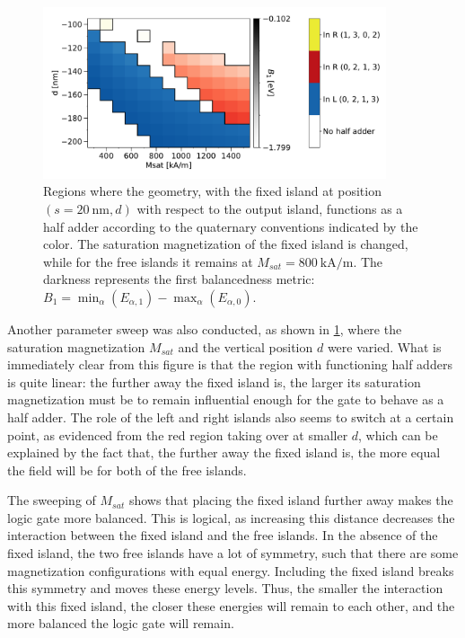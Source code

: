 \documentclass[11pt,a4paper,english]{article}
\begin{document}
\begin{figure}
    \centering
    \includegraphics[width=0.9\textwidth]{Figures/half_adder/sweep/000006_d-Msat/table(d100-200_10,Msat3e5-15e5_1e5)_balanced1.pdf}
    \caption{Regions where the geometry, with the fixed island at position $(s=\SI{20}{\nano\metre}, d)$ with respect to the output island, functions as a half adder according to the quaternary conventions indicated by the color. The saturation magnetization of the fixed island is changed, while for the free islands it remains at $M_{sat} = \SI{800}{\kilo\ampere\per\metre}$. The darkness represents the first balancedness metric: $B_1 = \min_\alpha(E_{\alpha,1}) - \max_\alpha(E_{\alpha,0})$.} 
    \label{fig:HalfAdder_000006_sweep_d-Msat_balanced1}
\end{figure}
Another parameter sweep was also conducted, as shown in \cref{fig:HalfAdder_000006_sweep_d-Msat_balanced1}, where the saturation magnetization $M_{sat}$ and the vertical position $d$ were varied. What is immediately clear from this figure is that the region with functioning half adders is quite linear: the further away the fixed island is, the larger its saturation magnetization must be to remain influential enough for the gate to behave as a half adder. The role of the left and right islands also seems to switch at a certain point, as evidenced from the red region taking over at smaller $d$, which can be explained by the fact that, the further away the fixed island is, the more equal the field will be for both of the free islands. \par
The sweeping of $M_{sat}$ shows that placing the fixed island further away makes the logic gate more balanced. This is logical, as increasing this distance decreases the interaction between the fixed island and the free islands. In the absence of the fixed island, the two free islands have a lot of symmetry, such that there are some magnetization configurations with equal energy. Including the fixed island breaks this symmetry and moves these energy levels. Thus, the smaller the interaction with this fixed island, the closer these energies will remain to each other, and the more balanced the logic gate will remain. \par
\end{document}
